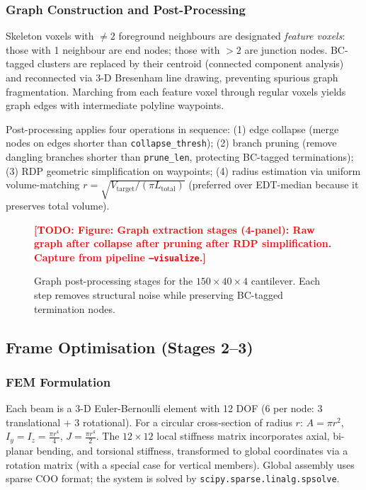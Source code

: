 \documentclass[11pt,a4paper]{article}
\newcommand{\TODO}[1]{\textcolor{red}{\textbf{[TODO: #1]}}}
\newcommand{\figstub}[2]{%
  \begin{figure}[htbp]\centering
    \TODO{Figure: #1}\caption{#2}\end{figure}}
\begin{document}
\subsubsection{Graph Construction and Post-Processing}

Skeleton voxels with $\neq 2$ foreground neighbours are designated \emph{feature
voxels}: those with 1 neighbour are end nodes; those with $>2$ are junction
nodes.
BC-tagged clusters are replaced by their centroid (connected component analysis)
and reconnected via 3-D Bresenham line drawing, preventing spurious graph
fragmentation.
Marching from each feature voxel through regular voxels yields graph edges with
intermediate polyline waypoints.

Post-processing applies four operations in sequence:
(1) edge collapse (merge nodes on edges shorter than \texttt{collapse\_thresh});
(2) branch pruning (remove dangling branches shorter than \texttt{prune\_len},
protecting BC-tagged terminations);
(3) RDP geometric simplification \cite{ramer1972} on waypoints;
(4) radius estimation via uniform volume-matching
$r = \sqrt{V_{\text{target}} / (\pi L_{\text{total}})}$ (preferred over
EDT-median because it preserves total volume).

\figstub{Graph extraction stages (4-panel): Raw graph \textrightarrow{}
  after collapse \textrightarrow{} after pruning \textrightarrow{}
  after RDP simplification. Capture from pipeline \texttt{--visualize}.}{
  Graph post-processing stages for the $150\times40\times4$ cantilever.
  Each step removes structural noise while preserving BC-tagged termination
  nodes.}

\subsection{Frame Optimisation (Stages 2--3)}
\label{subsec:frame_opt}

\subsubsection{FEM Formulation}

Each beam is a 3-D Euler-Bernoulli element with 12 DOF (6 per node: 3
translational + 3 rotational).
For a circular cross-section of radius $r$:
$A = \pi r^2$, $I_y = I_z = \tfrac{\pi r^4}{4}$, $J = \tfrac{\pi r^4}{2}$.
The $12\times12$ local stiffness matrix incorporates axial, bi-planar bending,
and torsional stiffness, transformed to global coordinates via a rotation
matrix (with a special case for vertical members).
Global assembly uses sparse COO format; the system is solved by
\texttt{scipy.sparse.linalg.spsolve}.
\end{document}
